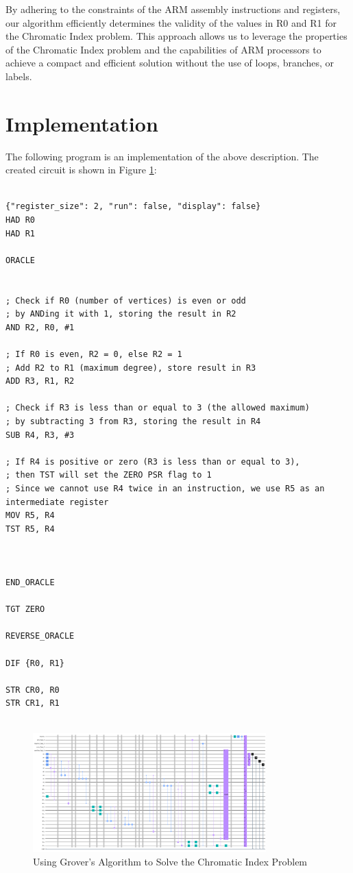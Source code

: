 By adhering to the constraints of the ARM assembly instructions and registers, our algorithm efficiently determines the validity of the values in R0 and R1 for the Chromatic Index problem. This approach allows us to leverage the properties of the Chromatic Index problem and the capabilities of ARM processors to achieve a compact and efficient solution without the use of loops, branches, or labels.



\section{Implementation}

The following program is an implementation of the above description. The created circuit is shown in Figure \ref{fig:Chromatic_Index}:

\begin{lstlisting}

{"register_size": 2, "run": false, "display": false}
HAD R0
HAD R1

ORACLE


; Check if R0 (number of vertices) is even or odd
; by ANDing it with 1, storing the result in R2
AND R2, R0, #1

; If R0 is even, R2 = 0, else R2 = 1
; Add R2 to R1 (maximum degree), store result in R3
ADD R3, R1, R2

; Check if R3 is less than or equal to 3 (the allowed maximum)
; by subtracting 3 from R3, storing the result in R4
SUB R4, R3, #3

; If R4 is positive or zero (R3 is less than or equal to 3),
; then TST will set the ZERO PSR flag to 1
; Since we cannot use R4 twice in an instruction, we use R5 as an intermediate register
MOV R5, R4
TST R5, R4



END_ORACLE

TGT ZERO

REVERSE_ORACLE

DIF {R0, R1}

STR CR0, R0
STR CR1, R1


\end{lstlisting}

\begin{figure}[htp]
    \centering
    \includegraphics[width=9cm]{Figures/Chromatic_Index_circuit.png}
    \caption{Using Grover's Algorithm to Solve the Chromatic Index Problem}
    \label{fig:Chromatic_Index}
\end{figure}

